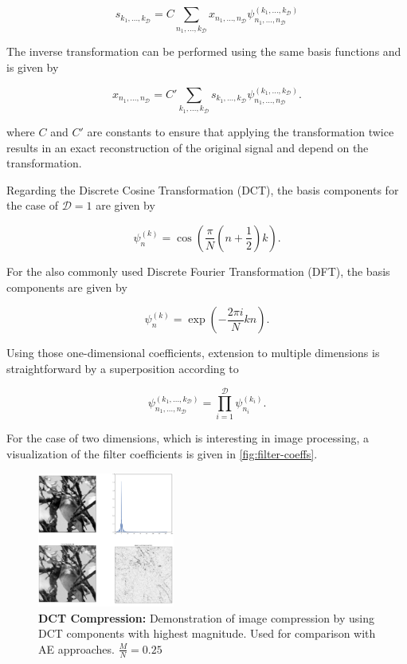 \documentclass[10pt,twocolumn,a4paper]{article}
\newcommand{\abbr}[2]{#1 (#2)}
\newcommand{\basis}{\psi}
\newcommand{\dims}{\mathcal D}
\begin{document}
\begin{equation}
s_{k_1, \dots, k_\dims} = C \sum_{n_1, \dots, k_\dims}
								x_{n_1,\dots,n_\dims}
								\basis_{n_1,\dots,n_\dims}^{(k_1,\dots,k_\dims)}
\label{eq:wavelet-transform}
\end{equation}

The inverse transformation can be performed using the same basis functions and is given by

\begin{equation}
x_{n_1, \dots, n_\dims} = C' \sum_{k_1, \dots, k_\dims}
								s_{k_1,\dots,k_\dims}
								\basis_{n_1,\dots,n_\dims}^{(k_1,\dots,k_\dims)}.
\end{equation}

where $C$ and $C'$ are constants to ensure that applying the transformation twice results in an exact reconstruction of the original signal and depend on the transformation.

Regarding the \abbr{Discrete Cosine Transformation}{DCT}, the basis components for the case of $\dims=1$ are given by

\begin{equation}
\basis_n^{(k)} = \cos \left( \frac{\pi}{N} (n+\frac{1}{2}) k \right).
\end{equation}

For the also commonly used \abbr{Discrete Fourier Transformation}{DFT}, the basis components are given by

\begin{equation}
\basis_{n}^{(k)} = \exp \left( - \frac{2 \pi i}{N} kn \right).
\end{equation}

Using those one-dimensional coefficients, extension to multiple dimensions is straightforward by a superposition according to

\begin{equation}
\basis_{n_1, \dots, n_\dims}^{(k_1, \dots, k_\dims)} = 
	\prod_{i=1}^{\dims} \basis_{n_i}^{(k_i)}.
\end{equation}

For the case of two dimensions, which is interesting in image processing, a visualization of the filter coefficients is given in \autoref{fig:filter-coeffs}.


\begin{figure}
\begin{center}
\includegraphics[width=0.4\textwidth]{fig/dct}
\end{center}
    \caption{\textbf{DCT Compression:}
        Demonstration of image compression by using DCT components with highest magnitude.
        Used for comparison with AE approaches.
        $\frac{M}{N} = 0.25$
        }
\label{fig:dct}
\end{figure}
\end{document}

